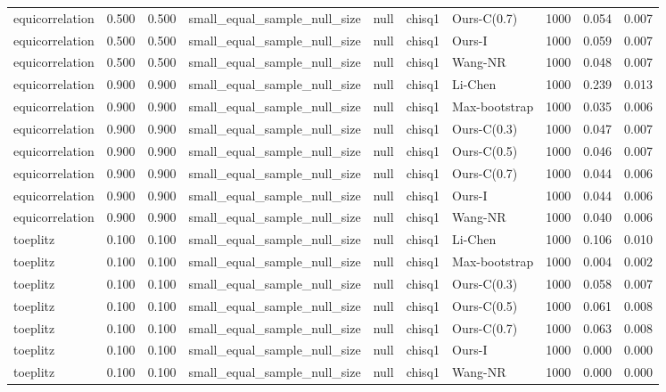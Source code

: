 \begin{tabular}{lrrllllrrr}
equicorrelation & 0.500 & 0.500 & small\_equal\_sample\_null\_size & null & chisq1 & Ours-C(0.7) & 1000 & 0.054 & 0.007 \\
equicorrelation & 0.500 & 0.500 & small\_equal\_sample\_null\_size & null & chisq1 & Ours-I & 1000 & 0.059 & 0.007 \\
equicorrelation & 0.500 & 0.500 & small\_equal\_sample\_null\_size & null & chisq1 & Wang-NR & 1000 & 0.048 & 0.007 \\
equicorrelation & 0.900 & 0.900 & small\_equal\_sample\_null\_size & null & chisq1 & Li-Chen & 1000 & 0.239 & 0.013 \\
equicorrelation & 0.900 & 0.900 & small\_equal\_sample\_null\_size & null & chisq1 & Max-bootstrap & 1000 & 0.035 & 0.006 \\
equicorrelation & 0.900 & 0.900 & small\_equal\_sample\_null\_size & null & chisq1 & Ours-C(0.3) & 1000 & 0.047 & 0.007 \\
equicorrelation & 0.900 & 0.900 & small\_equal\_sample\_null\_size & null & chisq1 & Ours-C(0.5) & 1000 & 0.046 & 0.007 \\
equicorrelation & 0.900 & 0.900 & small\_equal\_sample\_null\_size & null & chisq1 & Ours-C(0.7) & 1000 & 0.044 & 0.006 \\
equicorrelation & 0.900 & 0.900 & small\_equal\_sample\_null\_size & null & chisq1 & Ours-I & 1000 & 0.044 & 0.006 \\
equicorrelation & 0.900 & 0.900 & small\_equal\_sample\_null\_size & null & chisq1 & Wang-NR & 1000 & 0.040 & 0.006 \\
toeplitz & 0.100 & 0.100 & small\_equal\_sample\_null\_size & null & chisq1 & Li-Chen & 1000 & 0.106 & 0.010 \\
toeplitz & 0.100 & 0.100 & small\_equal\_sample\_null\_size & null & chisq1 & Max-bootstrap & 1000 & 0.004 & 0.002 \\
toeplitz & 0.100 & 0.100 & small\_equal\_sample\_null\_size & null & chisq1 & Ours-C(0.3) & 1000 & 0.058 & 0.007 \\
toeplitz & 0.100 & 0.100 & small\_equal\_sample\_null\_size & null & chisq1 & Ours-C(0.5) & 1000 & 0.061 & 0.008 \\
toeplitz & 0.100 & 0.100 & small\_equal\_sample\_null\_size & null & chisq1 & Ours-C(0.7) & 1000 & 0.063 & 0.008 \\
toeplitz & 0.100 & 0.100 & small\_equal\_sample\_null\_size & null & chisq1 & Ours-I & 1000 & 0.000 & 0.000 \\
toeplitz & 0.100 & 0.100 & small\_equal\_sample\_null\_size & null & chisq1 & Wang-NR & 1000 & 0.000 & 0.000 \\

\end{tabular}
